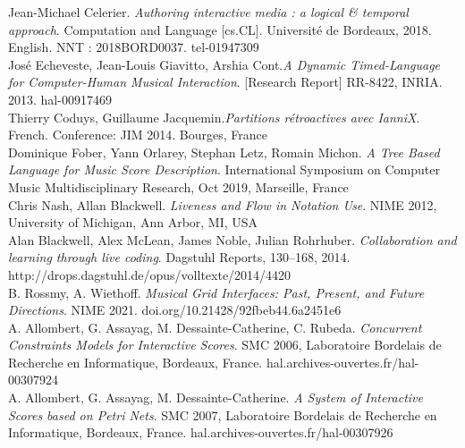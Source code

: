 \documentclass[journal,onecolumn]{IEEEtran}
\begin{document}
\begin{thebibliography}{1}

Jean-Michael Celerier. \emph{Authoring interactive media : a logical \& temporal approach}. Computation and Language [cs.CL]. Université de Bordeaux, 2018. English. NNT : 2018BORD0037. tel-01947309 \\

José Echeveste, Jean-Louis Giavitto, Arshia Cont.\emph{A Dynamic Timed-Language for Computer-Human Musical Interaction}. [Research Report] RR-8422, INRIA. 2013. hal-00917469 \\

Thierry Coduys, Guillaume Jacquemin.\emph{Partitions rétroactives
avec IanniX}. French. Conference: JIM 2014. Bourges, France \\

Dominique Fober, Yann Orlarey, Stephan Letz, Romain Michon. \emph{A Tree Based Language for Music Score Description}. International Symposium on Computer Music Multidisciplinary Research, Oct 2019, Marseille, France  \\

Chris Nash, Allan Blackwell. \emph{Liveness and Flow in Notation Use}. NIME 2012, University of Michigan, Ann Arbor, MI, USA \\

Alan Blackwell, Alex McLean, James Noble, Julian Rohrhuber. \emph{Collaboration and learning through live coding}. Dagstuhl Reports, 130--168, 2014. http://drops.dagstuhl.de/opus/volltexte/2014/4420 \\

B. Rossmy, A. Wiethoff. \emph{Musical Grid Interfaces: Past, Present, and Future Directions}. NIME 2021. doi.org/10.21428/92fbeb44.6a2451e6 \\

A. Allombert, G. Assayag, M. Dessainte-Catherine, C. Rubeda. \emph{Concurrent Constraints Models for Interactive Scores}. SMC 2006, Laboratoire Bordelais de Recherche en Informatique, Bordeaux, France. hal.archives-ouvertes.fr/hal-00307924 \\

A. Allombert, G. Assayag, M. Dessainte-Catherine. \emph{A System of Interactive Scores based on Petri Nets}. SMC 2007, Laboratoire Bordelais de Recherche en Informatique, Bordeaux, France. hal.archives-ouvertes.fr/hal-00307926 \\


\end{thebibliography}
\end{document}
